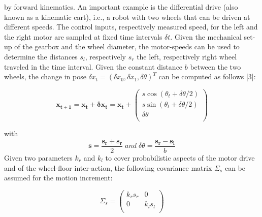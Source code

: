 \documentclass[english]{article}
\begin{document}
by forward kinematics.  An important example is the differential drive 
(also known as a kinematic cart), i.e., a robot with two wheels that can be
driven at different speeds.  The control inputs, respectively measured 
speed, for the left and the right motor are sampled at fixed time intervals 
$\delta t$.  Given the mechanical set-up of the gearbox and the wheel 
diameter, the motor-speeds can be used to determine the distances $s_{l}$, 
respectively $s_{r}$ the left, respectively right wheel traveled in the 
time interval.  Given the constant distance $b$ between the two wheels, the 
change in pose $\delta x_{t}= (\delta x_{0},\delta x_{1},\delta \theta)^{T}$
can be computed as follows [3]:

\begin{equation}
    \mathbf{x_{t+1}}=\mathbf{x_{t}}+\mathbf{\delta x_{t}}=\mathbf{x_{t}}+\left(
    \begin{array}{c}
        s \cos{\left( \theta_{t}+\delta\theta/2\right)} \\
        s \sin{\left(\theta_{t}+\delta\theta/2\right)}\\
        \delta\theta\\
    \end{array}
    \right)
    \label{eq:equation_1}
\end{equation}

with
\begin{equation}
    \mathbf{s}=\frac{\mathbf{s_{r}}+\mathbf{s_{r}}}{2}\;and\;\delta\theta
    =\frac{\mathbf{s_{r}}-\mathbf{s_{l}}}{b} \nonumber
\end{equation}
Given two parameters $k_{r}$ and $k_{l}$ to cover probabilistic aspects of 
the motor drive and of the wheel-floor inter-action, the following 
covariance matrix $\Sigma_{s}$ can be assumed for the motion increment:

\begin{equation}
    \Sigma_{s}=\left(\begin{array}{cc}
    k_{r}s_{r} & 0\\
     0 & k_{l}s_{l}\\
    \end{array}
    \right)
\end{equation}
\end{document}
